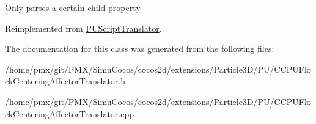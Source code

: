 Only parses a certain child property 

Reimplemented from \hyperlink{classPUScriptTranslator_a0374d83a8a04e57918975d525e0f8fe8}{P\+U\+Script\+Translator}.



The documentation for this class was generated from the following files\+:\begin{DoxyCompactItemize}
\item 
/home/pmx/git/\+P\+M\+X/\+Simu\+Cocos/cocos2d/extensions/\+Particle3\+D/\+P\+U/C\+C\+P\+U\+Flock\+Centering\+Affector\+Translator.\+h\item 
/home/pmx/git/\+P\+M\+X/\+Simu\+Cocos/cocos2d/extensions/\+Particle3\+D/\+P\+U/C\+C\+P\+U\+Flock\+Centering\+Affector\+Translator.\+cpp\end{DoxyCompactItemize}
